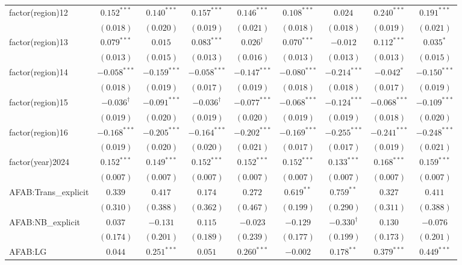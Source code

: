 \begin{landscape}
\begin{longtable}{lcccccccc}
factor(region)12 & $0.152^{***}$ & $0.140^{***}$ & $0.157^{***}$ & $0.146^{***}$ & $0.108^{***}$ & $0.024$ & $0.240^{***}$ & $0.191^{***}$ \\
 & $(0.018)$ & $(0.020)$ & $(0.019)$ & $(0.021)$ & $(0.018)$ & $(0.018)$ & $(0.019)$ & $(0.021)$ \\
factor(region)13 & $0.079^{***}$ & $0.015$ & $0.083^{***}$ & $0.026^{\dagger}$ & $0.070^{***}$ & $-0.012$ & $0.112^{***}$ & $0.035^{*}$ \\
 & $(0.013)$ & $(0.015)$ & $(0.013)$ & $(0.016)$ & $(0.013)$ & $(0.013)$ & $(0.013)$ & $(0.015)$ \\
factor(region)14 & $-0.058^{***}$ & $-0.159^{***}$ & $-0.058^{***}$ & $-0.147^{***}$ & $-0.080^{***}$ & $-0.214^{***}$ & $-0.042^{*}$ & $-0.150^{***}$ \\
 & $(0.018)$ & $(0.019)$ & $(0.017)$ & $(0.019)$ & $(0.018)$ & $(0.018)$ & $(0.017)$ & $(0.019)$ \\
factor(region)15 & $-0.036^{\dagger}$ & $-0.091^{***}$ & $-0.036^{\dagger}$ & $-0.077^{***}$ & $-0.068^{***}$ & $-0.124^{***}$ & $-0.068^{***}$ & $-0.109^{***}$ \\
 & $(0.019)$ & $(0.020)$ & $(0.019)$ & $(0.020)$ & $(0.019)$ & $(0.019)$ & $(0.018)$ & $(0.020)$ \\
factor(region)16 & $-0.168^{***}$ & $-0.205^{***}$ & $-0.164^{***}$ & $-0.202^{***}$ & $-0.169^{***}$ & $-0.255^{***}$ & $-0.241^{***}$ & $-0.248^{***}$ \\
 & $(0.019)$ & $(0.020)$ & $(0.020)$ & $(0.021)$ & $(0.017)$ & $(0.017)$ & $(0.019)$ & $(0.021)$ \\
factor(year)2024 & $0.152^{***}$ & $0.149^{***}$ & $0.152^{***}$ & $0.152^{***}$ & $0.152^{***}$ & $0.133^{***}$ & $0.168^{***}$ & $0.159^{***}$ \\
 & $(0.007)$ & $(0.007)$ & $(0.007)$ & $(0.007)$ & $(0.007)$ & $(0.007)$ & $(0.007)$ & $(0.007)$ \\
AFAB:Trans\_explicit & $0.339$ & $0.417$ & $0.174$ & $0.272$ & $0.619^{**}$ & $0.759^{**}$ & $0.327$ & $0.411$ \\
 & $(0.310)$ & $(0.388)$ & $(0.362)$ & $(0.467)$ & $(0.199)$ & $(0.290)$ & $(0.311)$ & $(0.388)$ \\
AFAB:NB\_explicit & $0.037$ & $-0.131$ & $0.115$ & $-0.023$ & $-0.129$ & $-0.330^{\dagger}$ & $0.130$ & $-0.076$ \\
 & $(0.174)$ & $(0.201)$ & $(0.189)$ & $(0.239)$ & $(0.177)$ & $(0.199)$ & $(0.173)$ & $(0.201)$ \\
AFAB:LG & $0.044$ & $0.251^{***}$ & $0.051$ & $0.260^{***}$ & $-0.002$ & $0.178^{**}$ & $0.379^{***}$ & $0.449^{***}$ \\

\end{longtable}
\end{landscape}
